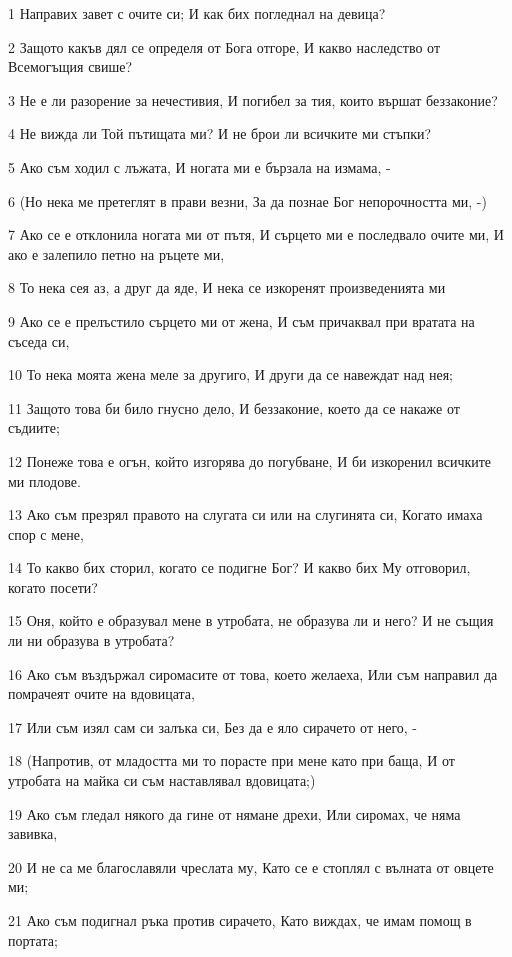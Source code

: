 \par 1 Направих завет с очите си; И как бих погледнал на девица?
\par 2 Защото какъв дял се определя от Бога отгоре, И какво наследство от Всемогъщия свише?
\par 3 Не е ли разорение за нечестивия, И погибел за тия, които вършат беззаконие?
\par 4 Не вижда ли Той пътищата ми? И не брои ли всичките ми стъпки?
\par 5 Ако съм ходил с лъжата, И ногата ми е бързала на измама, -
\par 6 (Но нека ме претеглят в прави везни, За да познае Бог непорочността ми, -)
\par 7 Ако се е отклонила ногата ми от пътя, И сърцето ми е последвало очите ми, И ако е залепило петно на ръцете ми,
\par 8 То нека сея аз, а друг да яде, И нека се изкоренят произведенията ми
\par 9 Ако се е прелъстило сърцето ми от жена, И съм причаквал при вратата на съседа си,
\par 10 То нека моята жена меле за другиго, И други да се навеждат над нея;
\par 11 Защото това би било гнусно дело, И беззаконие, което да се накаже от съдиите;
\par 12 Понеже това е огън, който изгорява до погубване, И би изкоренил всичките ми плодове.
\par 13 Ако съм презрял правото на слугата си или на слугинята си, Когато имаха спор с мене,
\par 14 То какво бих сторил, когато се подигне Бог? И какво бих Му отговорил, когато посети?
\par 15 Оня, който е образувал мене в утробата, не образува ли и него? И не същия ли ни образува в утробата?
\par 16 Ако съм въздържал сиромасите от това, което желаеха, Или съм направил да помрачеят очите на вдовицата,
\par 17 Или съм изял сам си залъка си, Без да е яло сирачето от него, -
\par 18 (Напротив, от младостта ми то порасте при мене като при баща, И от утробата на майка си съм наставлявал вдовицата;)
\par 19 Ако съм гледал някого да гине от нямане дрехи, Или сиромах, че няма завивка,
\par 20 И не са ме благославяли чреслата му, Като се е стоплял с вълната от овцете ми;
\par 21 Ако съм подигнал ръка против сирачето, Като виждах, че имам помощ в портата;
